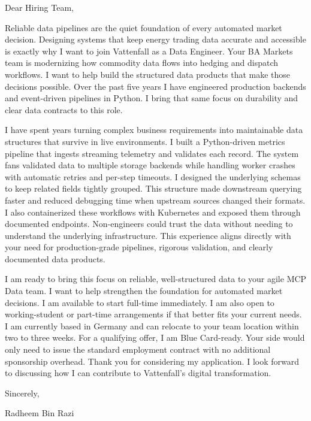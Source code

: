\documentclass[11pt,a4paper]{coverletter}
\begin{document}

\opening{Dear Hiring Team,}

Reliable data pipelines are the quiet foundation of every automated market decision. Designing systems that keep energy trading data accurate and accessible is exactly why I want to join Vattenfall as a Data Engineer. Your BA Markets team is modernizing how commodity data flows into hedging and dispatch workflows. I want to help build the structured data products that make those decisions possible. Over the past five years I have engineered production backends and event-driven pipelines in Python. I bring that same focus on durability and clear data contracts to this role.

I have spent years turning complex business requirements into maintainable data structures that survive in live environments. I built a Python-driven metrics pipeline that ingests streaming telemetry and validates each record. The system fans validated data to multiple storage backends while handling worker crashes with automatic retries and per-step timeouts. I designed the underlying schemas to keep related fields tightly grouped. This structure made downstream querying faster and reduced debugging time when upstream sources changed their formats. I also containerized these workflows with Kubernetes and exposed them through documented endpoints. Non-engineers could trust the data without needing to understand the underlying infrastructure. This experience aligns directly with your need for production-grade pipelines, rigorous validation, and clearly documented data products.

I am ready to bring this focus on reliable, well-structured data to your agile MCP Data team. I want to help strengthen the foundation for automated market decisions. I am available to start full-time immediately. I am also open to working-student or part-time arrangements if that better fits your current needs. I am currently based in Germany and can relocate to your team location within two to three weeks. For a qualifying offer, I am Blue Card-ready. Your side would only need to issue the standard employment contract with no additional sponsorship overhead. Thank you for considering my application. I look forward to discussing how I can contribute to Vattenfall’s digital transformation.

\closing{Sincerely,}{Radheem Bin Razi}

\clearpage
{}
\end{document}
